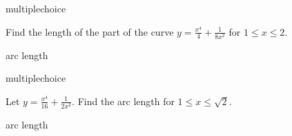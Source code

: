 \documentclass{ximera}
\begin{document}
\begin{question}[2016C.01]
\begin{type}
multiplechoice
\end{type}
Find the length of the part of the curve \(\displaystyle y = \frac{x^4}{4} + \frac{1}{8x^2}\) for \(1 \leq x \leq 2\).
\begin{multiplechoice}
\end{multiplechoice}
\begin{keywords}
arc length
\end{keywords}
\end{question}

\begin{question}[2017C.03]
\begin{type}
multiplechoice
\end{type}
Let \(\displaystyle y = \frac{x^4}{16} + \frac{1}{2x^2}\). Find the arc length for \(1 \leq x \leq \sqrt{2}\).
\begin{multiplechoice}
\end{multiplechoice}
\begin{keywords}
arc length
\end{keywords}
\end{question}
\end{document}
